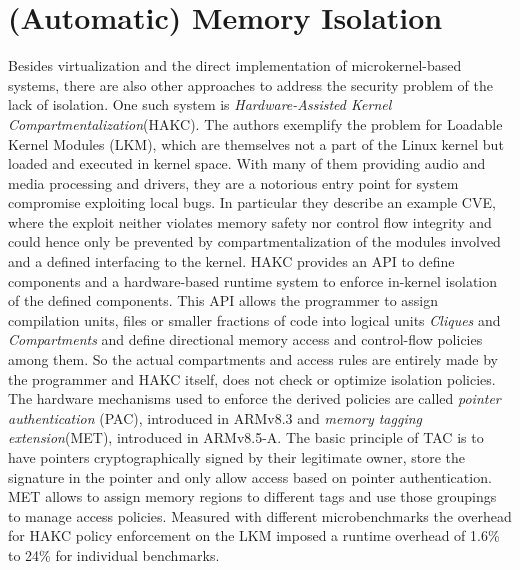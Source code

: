 \section{(Automatic) Memory Isolation}
\label{sec:MemoryIsolation}
Besides virtualization and the direct implementation of microkernel-based systems, there are also other approaches to address the security problem of the lack of isolation. One such system is \emph{Hardware-Assisted Kernel Compartmentalization}(HAKC)\cite{mckee2022preventing}. The authors exemplify the problem for Loadable Kernel Modules (LKM), which are themselves not a part of the Linux kernel but loaded and executed in 
kernel space. With many of them providing audio and media processing and drivers, they are a notorious entry point for system compromise exploiting local bugs. In particular they describe an example CVE, where the exploit neither violates memory safety nor control flow integrity and could hence only be prevented by compartmentalization of the modules involved and a defined interfacing to the kernel. HAKC provides an API to define components and a hardware-based runtime system to enforce in-kernel isolation of the defined components. This API allows the programmer to assign compilation units, files or smaller fractions of code into logical units \emph{Cliques} and \emph{Compartments} and define directional memory access and control-flow policies among them. So the actual compartments and access rules are entirely made by the programmer and HAKC itself, does not check or optimize isolation policies. The hardware mechanisms used to enforce the derived policies are called \emph{pointer authentication} (PAC), introduced in ARMv8.3 and \emph{memory tagging extension}(MET), introduced in ARMv8.5-A. The basic principle of TAC is to have pointers cryptographically signed by their legitimate owner, store the signature in the pointer and only allow access based on pointer authentication. MET allows to assign memory regions to different tags and use those groupings to manage access policies. Measured with  different microbenchmarks the overhead for HAKC policy enforcement on the  LKM imposed a runtime overhead of 1.6\% to 24\% for individual benchmarks.\\

